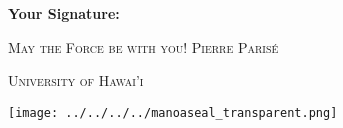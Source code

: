 \documentclass[addpoints, 12pt]{exam}%
\theoremstyle{definition}
\begin{document}
\vspace{1cm}

\noindent\textbf{Your Signature:} \hrulefill

\vspace*{1.5cm}
\noindent \textsc{May the Force be with you!} \hfill \textsc{Pierre Parisé}

\vspace*{0.5cm}

\begin{center}
\begin{minipage}{0.29\textwidth}
\begin{Huge}
\textsc{University of Hawai'i}
\end{Huge}
\end{minipage}
\begin{minipage}{0.12\textwidth}
\texttt{[image: ../../../../manoaseal\_transparent.png]}
\end{minipage}
\end{center}


\vspace*{0.5cm}

\newpage %
\end{document}
